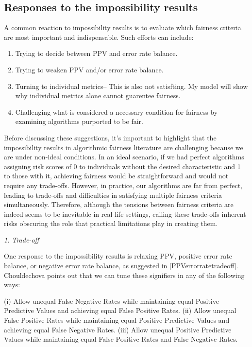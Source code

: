 \documentclass{article}
\begin{document}
\subsection{Responses to the impossibility results}

A common reaction to impossibility results is to evaluate which fairness criteria are most important and indispensable. Such efforts can include: 
\begin{enumerate}
    \item Trying to decide between PPV and error rate balance. \label{PPVerrorratetradeoff}
     \item Trying to weaken PPV and/or error rate balance. 
    \item Turning to individual metrics-- This is also not satisfting. My model will show why individual metrics alone cannot guarentee fairness. 
    \item Challenging what is considered a necessary condition for fairness by examining algorithms purported to be fair. \label{reject}
\end{enumerate}

Before discussing these suggestions, it's important to highlight that the impossibility results in algorithmic fairness literature are challenging because we are under non-ideal conditions. In an ideal scenario, if we had perfect algorithms assigning risk scores of 0 to individuals without the desired characteristic and 1 to those with it, achieving fairness would be straightforward and would not require any trade-offs. However, in practice, our algorithms are far from perfect, leading to trade-offs and difficulties in satisfying multiple fairness criteria simultaneously. Therefore, although the tensions between fairness criteria are indeed seems to be inevitable in real life settings, calling these trade-offs inherent risks obscuring the role that practical limitations play in creating them. 

\textit{1. Trade-off}

One response to the impossibility results is relaxing PPV, positive error rate balance, or negative error rate balance, as suggested in \ref{PPVerrorratetradeoff}. Chouldechova \citeyear[p. 161]{Chouldechova_2017} points out that we can tune these signifiers in any of the following ways:

(i) Allow unequal False Negative Rates while maintaining equal Positive Predictive Values and achieving equal False Positive Rates.
(ii) Allow unequal False Positive Rates while maintaining equal Positive Predictive Values and achieving equal False Negative Rates.
(iii) Allow unequal Positive Predictive Values while maintaining equal False Positive Rates and False Negative Rates.
\end{document}
